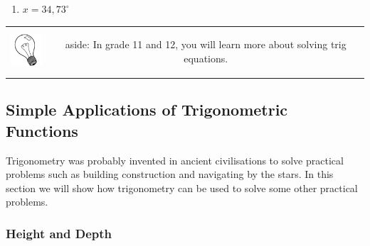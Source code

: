 {\begin{mdframed}[linewidth=4, leftmargin=40, rightmargin=40]
\begin{exercise}
\begin{enumerate}[noitemsep, label=\textbf{Step} \textbf{\arabic*}. ]
\item 
\begin{math}x=34,{73}^{\circ }\end{math}
\end{enumerate}
        


    \end{exercise}
    \end{mdframed}
    }
    \noindent
  \label{m39411*eip-858}
\begin{tabular}{cc}
	\hspace*{-50pt}\includegraphics[width=0.5in]{col11306.imgs/psbulb2.png}  & 

	\begin{minipage}{0.85\textwidth}
	\begin{note}
      {aside: }In grade 11 and 12, you will learn more about solving trig equations. 
	\end{note}
	\end{minipage}
	\end{tabular}
	\par
      \label{m39411*cid6}
            \subsection{ Simple Applications of Trigonometric Functions}
            \nopagebreak
            
      
      \label{m39411*id81626}Trigonometry was probably invented in ancient civilisations to solve practical problems such as building construction and navigating by the stars. In this section we will show how trigonometry can be used to solve some other practical problems.\par 
      \label{m39411*uid25}
            \subsubsection{ Height and Depth}
            \nopagebreak
            
        
        
    \setcounter{subfigure}{0}



